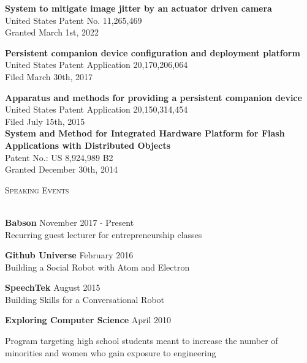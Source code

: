 \documentclass[a4paper]{article}
\newcommand{\lineunder} {
    \vspace*{-8pt} \\
    \hspace*{-18pt} \hrulefill \\
}
\newcommand{\header} [1] {
    {\hspace*{-18pt}\vspace*{6pt} \textsc{#1}}
    \vspace*{-6pt} \lineunder
    \vspace{2mm}
}
\begin{document}
\textbf{System to mitigate image jitter by an actuator driven camera}\\
United States Patent No. 11,265,469\\
Granted March 1st, 2022
\vspace*{2mm}

\textbf{Persistent companion device configuration and deployment platform}\\
United States Patent Application 20,170,206,064\\
Filed March 30th, 2017
\vspace*{2mm}

\textbf{Apparatus and methods for providing a persistent companion device}\\
United States Patent Application 20,150,314,454\\
Filed July 15th, 2015\\

\vspace*{2mm}
\textbf{System and Method for Integrated Hardware Platform for Flash Applications
with Distributed Objects}\\
Patent No.: US 8,924,989 B2\\
Granted December 30th, 2014 \\
\vspace*{4mm}

\newpage

\pagebreak[3]

\header{\faCommentingO \hspace{1pt} Speaking Events}
\textbf{Babson} \hfill November 2017 - Present\\
Recurring guest lecturer for entrepreneurship classes 
\vspace*{2mm}

\textbf{Github Universe} \hfill February 2016\\
Building a Social Robot with Atom and Electron 
\vspace*{2mm}

\textbf{SpeechTek} \hfill August 2015\\
Building Skills for a Conversational Robot
\vspace*{2mm}

\pagebreak[3]

\textbf{Exploring Computer Science} \hfill April 2010\\
\begin{addmargin}[0em]{4em}
Program targeting high school students meant to increase the number of
minorities and women who gain exposure to engineering
\end{addmargin}
\vspace*{2mm}
\end{document}
